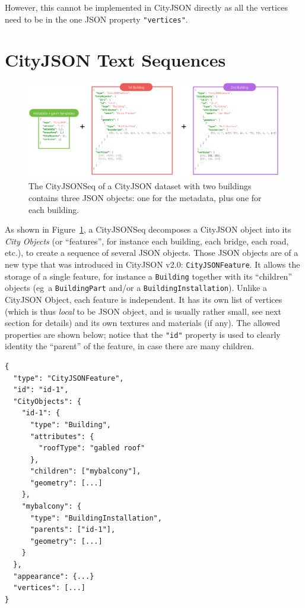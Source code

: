 \documentclass{isprs} %
\newcommand{\eg}{eg}
\begin{document}
However, this cannot be implemented in CityJSON directly as all the vertices need to be in the one JSON property \texttt{"vertices"}.


%
\section{CityJSON Text Sequences}%
\label{sec:cityjsonseq}

\begin{figure}[h]
  \centering
  \includegraphics[width=0.95\linewidth]{figs/cjseq_idea}
  \caption{The CityJSONSeq of a CityJSON dataset with two buildings contains three JSON objects: one for the metadata, plus one for each building.}%
\label{fig:cjseq_idea}
\end{figure}

As shown in Figure~\ref{fig:cjseq_idea}, a CityJSONSeq decomposes a CityJSON object into its \emph{City Objects} (or ``features'', for instance each building, each bridge, each road, etc.), to create a sequence of several JSON objects.
Those JSON objects are of a new type that was introduced in CityJSON v2.0: \texttt{CityJSONFeature}.
It allows the storage of a single feature, for instance a \texttt{Building} together with its ``children'' objects (\eg\ a \texttt{BuildingPart} and/or a \texttt{BuildingInstallation}). 
Unlike a CityJSON Object, each feature is independent. 
It has its own list of vertices (which is thus \emph{local} to be JSON object, and is usually rather small, see next section for details) and its own textures and materials (if any).
The allowed properties are shown below; notice that the \texttt{"id"} property is used to clearly identity the ``parent'' of the feature, in case there are many children.
\begin{lstlisting}
{
  "type": "CityJSONFeature",
  "id": "id-1", 
  "CityObjects": {
    "id-1": {
      "type": "Building", 
      "attributes": { 
        "roofType": "gabled roof"
      },
      "children": ["mybalcony"],
      "geometry": [...]
    },
    "mybalcony": {
      "type": "BuildingInstallation", 
      "parents": ["id-1"],
      "geometry": [...]
    }
  },
  "appearance": {...}
  "vertices": [...]
}
\end{lstlisting}
\end{document}
